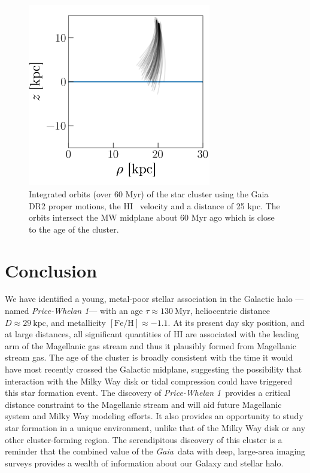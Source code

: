 \documentclass[twocolumn]{aastex62}
\newcommand{\gaia}{\textsl{Gaia}}
\newcommand{\feh}{\ensuremath{[\textrm{Fe} / \textrm{H}]}}
\newcommand{\hi}{H{\footnotesize I} }
\newcommand{\clustername}{\textsl{Price-Whelan 1}}
\newcommand{\clage}{\ensuremath{130~\textrm{Myr}}}
\newcommand{\clfeh}{\ensuremath{-1.1}}
\newcommand{\cldist}{\ensuremath{29~\textrm{kpc}}}
\begin{document}
\begin{figure}
\centering
\includegraphics[width=8cm]{orbits.png}
\caption{Integrated orbits (over 60 Myr) of the star cluster using the Gaia DR2 proper motions, the
\hi~velocity and a distance of 25 kpc.  The orbits intersect the MW midplane about
60 Myr ago which is close to the age of the cluster.}
\label{fig_gass}
\end{figure}

%
%
%
%


\section{Conclusion} \label{sec:conclusion}

We have identified a young, metal-poor stellar association in the Galactic halo --- named \clustername --- with an age $\tau \approx \clage$, heliocentric distance $D \approx \cldist$, and metallicity $\feh \approx \clfeh$.
At its present day sky position, and at large distances, all significant quantities of \hi are associated with the leading arm of the Magellanic gas stream and thus it plausibly formed from Magellanic stream gas.
The age of the cluster is broadly consistent with the time it would have most recently crossed the Galactic midplane, suggesting the possibility that interaction with the Milky Way disk or tidal compression could have triggered this star formation event.
The discovery of \clustername\ provides a critical distance constraint to the Magellanic stream and will aid future Magellanic system and Milky Way modeling efforts.
It also provides an opportunity to study star formation in a unique environment, unlike that of the Milky Way disk or any other cluster-forming region.
The serendipitous discovery of this cluster is a reminder that the combined value of the \gaia\ data with deep, large-area imaging surveys provides a wealth of information about our Galaxy and stellar halo.
\end{document}
